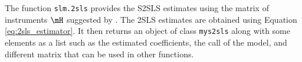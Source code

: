\begin{knitrout}
\end{knitrout}

The function \texttt{slm.2sls} provides the S2SLS estimates using the matrix of instruments $\mH$ suggested by \cite{kelejian1998generalized}. The 2SLS estimates are obtained using Equation \eqref{eq:2sls_estimator}. It then returns an object of class \texttt{mys2sls} along with some elements as a list such as the estimated coefficients, the call of the model, and different matrix that can be used in other functions. 

